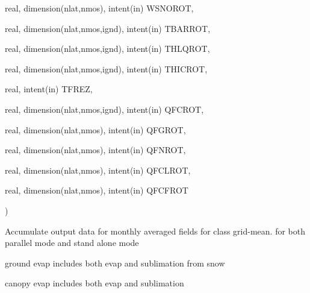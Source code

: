 {\begin{DoxyParamCaption}
\item[{real, dimension(nlat,nmos), intent(in)}]{W\+S\+N\+O\+R\+O\+T, }
\item[{real, dimension(nlat,nmos,ignd), intent(in)}]{T\+B\+A\+R\+R\+O\+T, }
\item[{real, dimension(nlat,nmos,ignd), intent(in)}]{T\+H\+L\+Q\+R\+O\+T, }
\item[{real, dimension(nlat,nmos,ignd), intent(in)}]{T\+H\+I\+C\+R\+O\+T, }
\item[{real, intent(in)}]{T\+F\+R\+E\+Z, }
\item[{real, dimension(nlat,nmos,ignd), intent(in)}]{Q\+F\+C\+R\+O\+T, }
\item[{real, dimension(nlat,nmos), intent(in)}]{Q\+F\+G\+R\+O\+T, }
\item[{real, dimension(nlat,nmos), intent(in)}]{Q\+F\+N\+R\+O\+T, }
\item[{real, dimension(nlat,nmos), intent(in)}]{Q\+F\+C\+L\+R\+O\+T, }
\item[{real, dimension(nlat,nmos), intent(in)}]{Q\+F\+C\+F\+R\+O\+T}
\end{DoxyParamCaption}
)}\label{group__io__driver__class__monthly__aw_ga5036e6789d5928d201cfc65ce1997831}
Accumulate output data for monthly averaged fields for class grid-\/mean. for both parallel mode and stand alone mode

ground evap includes both evap and sublimation from snow

canopy evap includes both evap and sublimation 